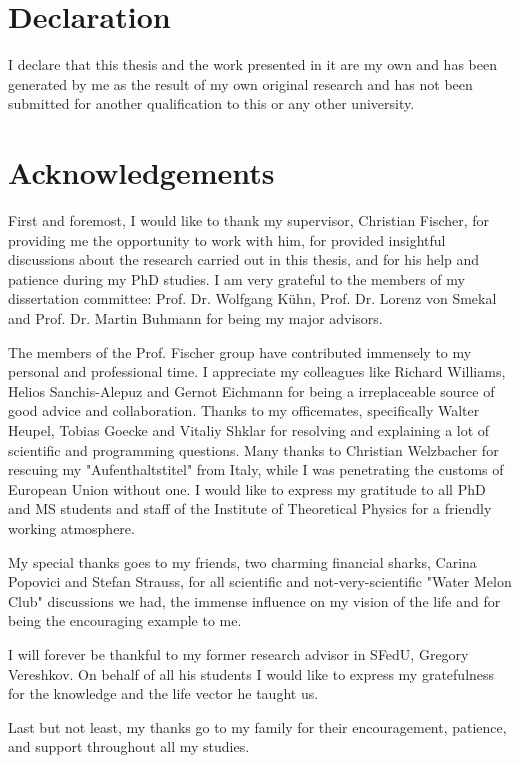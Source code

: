 \chapter*{Declaration}
I declare that this thesis and the work presented in it are my own and has been generated by me as the result of my own original research and has not been submitted for another qualification to this or any other university.



\chapter*{Acknowledgements}
First and foremost, I would like to thank my supervisor, Christian Fischer, for providing
me the opportunity to work with him, for provided insightful discussions about the research carried out in this
thesis, and for his help and patience during my PhD studies. I am very grateful to the members of my dissertation committee: Prof. Dr. Wolfgang K{\"u}hn, Prof. Dr. Lorenz von Smekal and Prof. Dr. Martin Buhmann for being my major advisors.

The members of the Prof. Fischer group have contributed immensely to my personal and
professional time. I appreciate my colleagues like Richard Williams, Helios Sanchis-Alepuz and Gernot Eichmann for being a irreplaceable source of good advice and collaboration. Thanks to my officemates, specifically Walter Heupel, Tobias Goecke and Vitaliy Shklar for resolving and explaining a lot of scientific and programming questions. Many thanks to Christian Welzbacher for rescuing my "Aufenthaltstitel" from Italy, while I was penetrating the customs of European Union without one. I would like to express my gratitude to all PhD and MS students and staff of the Institute of Theoretical Physics for a friendly working atmosphere. 

My special thanks goes to my friends, two charming financial sharks, Carina Popovici and Stefan Strauss, for all scientific and not-very-scientific "Water Melon Club" discussions we had, the immense influence on my vision of the life and for being the encouraging example to me. 

I will forever be thankful to my former research advisor in SFedU, Gregory Vereshkov. On behalf of all his students I would like to express my gratefulness for the knowledge and the life vector he taught us. 

Last but not least, my thanks go to my family for their encouragement, patience, and support throughout all my studies.


